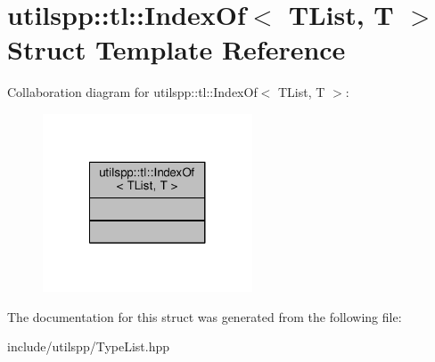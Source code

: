 \hypertarget{structutilspp_1_1tl_1_1IndexOf}{\section{utilspp\-:\-:tl\-:\-:Index\-Of$<$ T\-List, T $>$ Struct Template Reference}
\label{structutilspp_1_1tl_1_1IndexOf}
}


Collaboration diagram for utilspp\-:\-:tl\-:\-:Index\-Of$<$ T\-List, T $>$\-:\nopagebreak
\begin{figure}[H]
\begin{center}
\leavevmode
\includegraphics[width=176pt]{structutilspp_1_1tl_1_1IndexOf__coll__graph}
\end{center}
\end{figure}


The documentation for this struct was generated from the following file\-:\begin{DoxyCompactItemize}
\item 
include/utilspp/Type\-List.\-hpp\end{DoxyCompactItemize}
